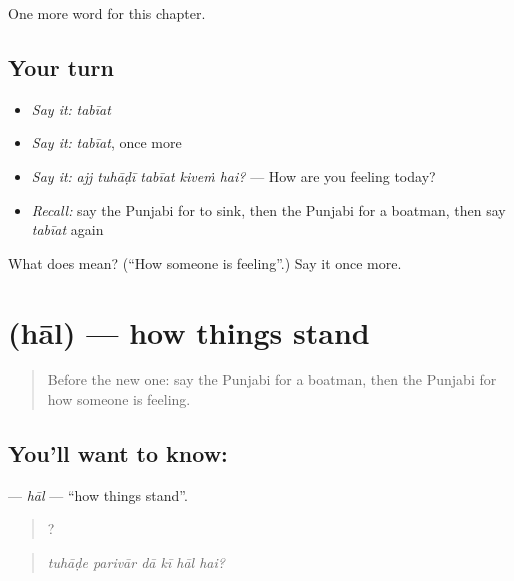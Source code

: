 \begin{grammarlens}[title={What you've built}]
One more word for this chapter.
\end{grammarlens}

\subsection*{Your turn}
\begin{itemize}
\raggedright
  \item \emph{Say it:} \emph{tabīat}
  \item \emph{Say it:} \emph{tabīat}, once more
  \item \emph{Say it:} \emph{ajj tuhāḍī tabīat kiveṁ hai?} — How are you feeling today?
  \item \emph{Recall:} say the Punjabi for to sink, then the Punjabi for a boatman, then say \emph{tabīat} again
\end{itemize}

\begin{tcolorbox}[breakable,colback=teal!4,colframe=teal!35!black,title={Before you move on}]
What does  mean? (\textquotedblleft{}How someone is feeling\textquotedblright{}.) Say it once more.
\end{tcolorbox}
\section[\texorpdfstring{\pa{ਹਾਲ} (hāl)}{ਹਾਲ (hāl)}]{ (hāl) — how things stand}

\label{lesson:PA-C319-hal}



\begin{quote}
Before the new one: say the Punjabi for a boatman, then the Punjabi for how someone is feeling.
\end{quote}

\subsection*{You'll want to know: }
\textbf{} — \emph{hāl} — \textquotedblleft{}how things stand\textquotedblright{}.

\begin{quote}
     ?
\end{quote}

\begin{quote}
\emph{tuhāḍe parivār dā kī hāl hai?}
\end{quote}

